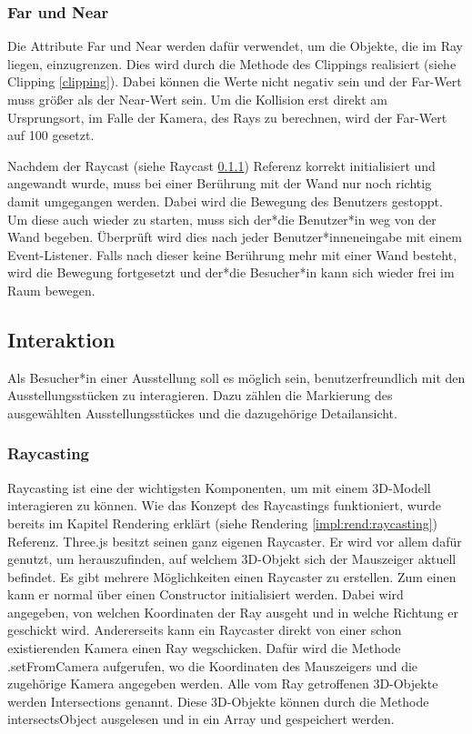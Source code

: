 \subsubsection{Far und Near}
Die Attribute Far und Near werden dafür verwendet, um die Objekte, die im Ray liegen, einzugrenzen. Dies wird durch die Methode des Clippings realisiert (siehe Clipping \ref{clipping}). Dabei können die Werte nicht negativ sein und der Far-Wert muss größer als der Near-Wert sein. Um die Kollision erst direkt am Ursprungsort, im Falle der Kamera, des Rays zu berechnen, wird der Far-Wert auf 100 gesetzt.
   	
Nachdem der Raycast (siehe Raycast \ref{impl:int:raycasting}) Referenz korrekt initialisiert und angewandt wurde, muss bei einer Berührung mit der Wand nur noch richtig damit umgegangen werden. Dabei wird die Bewegung des Benutzers gestoppt. Um diese auch wieder zu starten, muss sich der*die Benutzer*in weg von der Wand begeben. Überprüft wird dies nach jeder Benutzer*inneneingabe mit einem Event-Listener. Falls nach dieser keine Berührung mehr mit einer Wand besteht, wird die Bewegung fortgesetzt und der*die Besucher*in kann sich wieder frei im Raum bewegen.


\subsection{Interaktion}
Als Besucher*in einer Ausstellung soll es möglich sein, benutzerfreundlich mit den Ausstellungsstücken zu interagieren. Dazu zählen die Markierung des ausgewählten Ausstellungsstückes und die dazugehörige Detailansicht. 

\subsubsection{Raycasting}
\label{impl:int:raycasting}
Raycasting ist eine der wichtigsten Komponenten, um mit einem 3D-Modell interagieren zu können. Wie das Konzept des Raycastings funktioniert, wurde bereits im Kapitel Rendering erklärt (siehe Rendering \ref{impl:rend:raycasting}) Referenz. Three.js besitzt seinen ganz eigenen Raycaster. Er wird vor allem dafür genutzt, um herauszufinden, auf welchem 3D-Objekt sich der Mauszeiger aktuell befindet. Es gibt mehrere Möglichkeiten einen Raycaster zu erstellen. Zum einen kann er normal über einen Constructor initialisiert werden. Dabei wird angegeben, von welchen Koordinaten der Ray ausgeht und in welche Richtung er geschickt wird. Andererseits kann ein Raycaster direkt von einer schon existierenden Kamera einen Ray wegschicken. Dafür wird die Methode .setFromCamera aufgerufen, wo die Koordinaten des Mauszeigers und die zugehörige Kamera angegeben werden. Alle vom Ray getroffenen 3D-Objekte werden Intersections genannt. Diese 3D-Objekte können durch die Methode intersectsObject ausgelesen und in ein Array und gespeichert werden.

